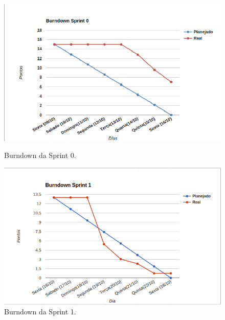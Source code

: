 	\begin{figure}[!h]
	\begin{minipage}[b]{0.5\linewidth} 
	\centering
	\includegraphics[scale=0.5]{figuras/burndown_sprint0.png}
	\caption{Burndown da Sprint 0.}
	\label{fig:burndown0}
	\end{minipage}
	\hspace{0.5cm} 
	\begin{minipage}[b]{0.5\linewidth}
	\centering
	\includegraphics[scale=0.5]{figuras/burndown_sprint1.png}
	\caption{Burndown da Sprint 1.}
	\label{fig:burndown1}
	\end{minipage}
	\end{figure}
	
